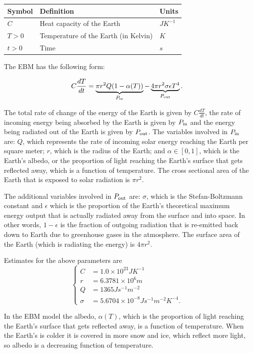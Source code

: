 \documentclass{exam}
\begin{document}
\begin{longtable}[]{@{}lll@{}}
\toprule\noalign{}
Symbol & Definition & Units \\
\midrule\noalign{}
\endhead
\bottomrule\noalign{}
\endlastfoot
\(C\) & Heat capacity of the Earth & \(J K^{-1}\) \\
\(T > 0\) & Temperature of the Earth (in Kelvin) & \(K\) \\
\(t>0\) & Time & \(s\) \\
\end{longtable}

The EBM has the following form:

\[C \frac{d T}{d t} = \underbrace{\pi r^2 Q (1-\alpha(T))}_\text{$P_{\rm in}$} - \underbrace{4 \pi r^2 \sigma \epsilon T^4}_\text{$P_{\rm out}$}. \]

The total rate of change of the energy of the Earth is given by
\(C\frac{dT}{dt}\), the rate of incoming energy being absorbed by the
Earth is given by \(P_{\rm in}\) and the energy being radiated out of
the Earth is given by \(P_{\rm out}\). The variables involved in
\(P_{\rm in}\) are: \(Q\), which represents the rate of incoming solar
energy reaching the Earth per square meter; \(r\), which is the radius
of the Earth; and \(\alpha \in [0,1]\), which is the Earth's albedo, or
the proportion of light reaching the Earth's surface that gets reflected
away, which is a function of temperature. The cross sectional area of
the Earth that is exposed to solar radiation is \(\pi r^2\).

The additional variables involved in \(P_{\rm out}\) are: \(\sigma\),
which is the Stefan-Boltzmann constant and \(\epsilon\) which is the
proportion of the Earth's theoretical maximum energy output that is
actually radiated away from the surface and into space. In other words,
\(1-\epsilon\) is the fraction of outgoing radiation that is re-emitted
back down to Earth due to greenhouse gases in the atmosphere. The
surface area of the Earth (which is radiating the energy) is
\(4\pi r^2\).

Estimates for the above parameters are \[
\begin{cases}
    C & = 1.0 \times 10^{23} J K^{-1} \\
    r & = 6.3781 \times 10^{6}m \\
    Q & = 1365 J s^{-1} m^{-2} \\
    \sigma &= 5.6704 \times 10^{-8} J s^{-1} m^{-2} K^{-4}.
\end{cases}
\]

In the EBM model the albedo, \(\alpha(T)\), which is the proportion of
light reaching the Earth's surface that gets reflected away, is a
function of temperature. When the Earth's is colder it is covered in
more snow and ice, which reflect more light, so albedo is a decreasing
function of temperature.
\end{document}
